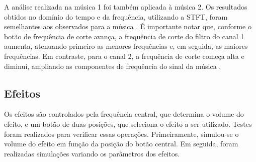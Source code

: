



A análise realizada na música 1 %
foi também aplicada à música 2. %
Os resultados obtidos no domínio do tempo e da frequência, utilizando a STFT, foram semelhantes aos observados para a música \cite{track01}. É importante notar que, conforme o botão de frequência de corte avança, a frequência de corte do filtro do canal 1 aumenta, atenuando primeiro as menores frequências e, em seguida, as maiores frequências. Em contraste, para o canal 2, a frequência de corte começa alta e diminui, ampliando as componentes de frequência do sinal da música \cite{track02}.

\subsection{Efeitos}

Os efeitos são controlados pela frequência central, que determina o volume do efeito, e um botão de duas posições, que seleciona o efeito a ser utilizado. Testes foram realizados para verificar essas operações.
Primeiramente, simulou-se o volume do efeito em função da posição do botão central. Em seguida, foram realizadas simulações variando os parâmetros dos efeitos.

